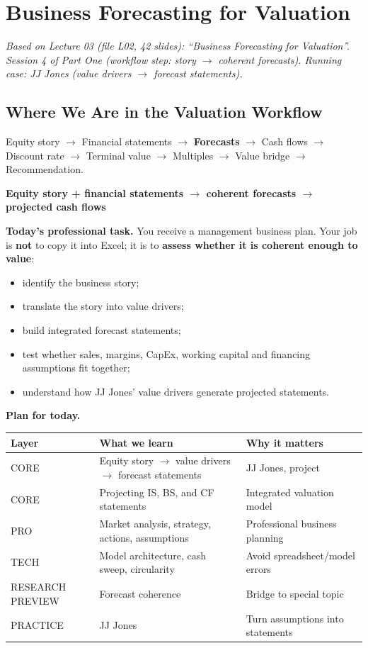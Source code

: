 \chapter{Business Forecasting for Valuation}\label{ch:forecast}

\emph{Based on Lecture 03 (file L02, 42 slides): ``Business Forecasting for Valuation''. Session 4 of Part One (workflow step: story $\to$ coherent forecasts). Running case: JJ Jones (value drivers $\to$ forecast statements).}

\section{Where We Are in the Valuation Workflow}

Equity story $\to$ Financial statements $\to$ \textbf{Forecasts} $\to$ Cash flows $\to$ Discount rate $\to$ Terminal value $\to$ Multiples $\to$ Value bridge $\to$ Recommendation.

\begin{keybox}[Today]
\textbf{Equity story + financial statements $\longrightarrow$ coherent forecasts $\longrightarrow$ projected cash flows}
\end{keybox}

\textbf{Today's professional task.} You receive a management business plan. Your job is \textbf{not} to copy it into Excel; it is to \textbf{assess whether it is coherent enough to value}:
\begin{itemize}
  \item identify the business story;
  \item translate the story into value drivers;
  \item build integrated forecast statements;
  \item test whether sales, margins, CapEx, working capital and financing assumptions fit together;
  \item understand how JJ Jones' value drivers generate projected statements.
\end{itemize}

\textbf{Plan for today.}
\begin{center}
\small
\begin{tabularx}{\textwidth}{@{}lXX@{}}
\toprule
\textbf{Layer} & \textbf{What we learn} & \textbf{Why it matters}\\
\midrule
CORE & Equity story $\to$ value drivers $\to$ forecast statements & JJ Jones, project\\
CORE & Projecting IS, BS, and CF statements & Integrated valuation model\\
PRO & Market analysis, strategy, actions, assumptions & Professional business planning\\
TECH & Model architecture, cash sweep, circularity & Avoid spreadsheet/model errors\\
RESEARCH PREVIEW & Forecast coherence & Bridge to special topic\\
PRACTICE & JJ Jones & Turn assumptions into statements\\
\bottomrule
\end{tabularx}
\end{center}

